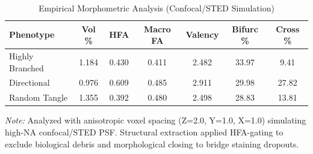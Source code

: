 \begin{table}[h!]
\centering
\caption{Empirical Morphometric Analysis (Confocal/STED Simulation)}
\label{tab:empirical_fiber_metrics}
\begin{tabular}{l | c c c c c c}
\hline
\textbf{Phenotype} & \textbf{Vol \%} & \textbf{HFA} & \textbf{Macro FA} & \textbf{Valency} & \textbf{Bifurc \%} & \textbf{Cross \%} \\
\hline
Highly Branched & 1.184 & 0.430 & 0.411 & 2.482 & 33.97 & 9.41 \\
Directional & 0.976 & 0.609 & 0.485 & 2.911 & 29.98 & 27.82 \\
Random Tangle & 1.355 & 0.392 & 0.480 & 2.498 & 28.83 & 13.81 \\
\hline
\end{tabular}
\vspace{1ex}
\raggedright \small{\textit{Note:} Analyzed with anisotropic voxel spacing (Z=2.0, Y=1.0, X=1.0) simulating high-NA confocal/STED PSF. Structural extraction applied HFA-gating to exclude biological debris and morphological closing to bridge staining dropouts.}
\end{table}